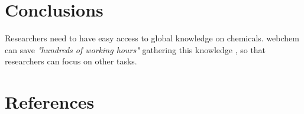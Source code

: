 \section[Conclusions]{Conclusions}
Researchers need to have easy access to global knowledge on chemicals.
webchem can save \emph{"hundreds of working hours"} gathering this knowledge \citep{munchalizia2016}, so that researchers can focus on other tasks.



\clearpage
\section{References}
\printbibliography[heading=none]
